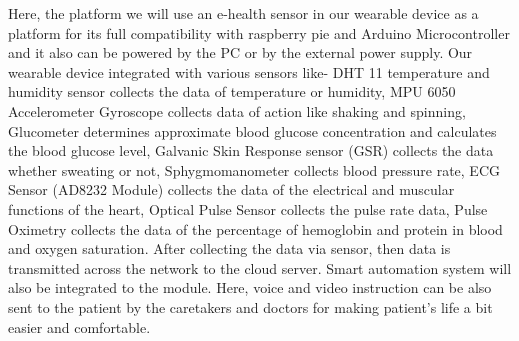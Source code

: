 \vspace{0.5cm}
Here, the platform we will use an e-health sensor in our wearable device as a platform for its full compatibility with raspberry pie and Arduino Microcontroller and it also can be powered by the PC or by the external power supply. %
Our wearable device integrated with various sensors like-  
DHT 11 temperature and humidity sensor collects the data of temperature or humidity, MPU 6050 Accelerometer Gyroscope collects data of action like shaking and spinning, Glucometer determines approximate blood glucose concentration and calculates the blood glucose level, Galvanic Skin Response sensor (GSR) collects the data whether sweating or not, Sphygmomanometer collects blood pressure rate, ECG Sensor (AD8232 Module) collects the data of the electrical and muscular functions of the heart, Optical Pulse Sensor collects the pulse rate data, Pulse Oximetry collects the data of the percentage of hemoglobin and protein in blood and oxygen saturation. After collecting the data via sensor, then data is transmitted across the network to the cloud server. %
 Smart automation system will also be integrated to the module. Here, voice and video instruction can be also sent to the patient by the caretakers and doctors for making patient’s life a bit easier and comfortable.
 
 
 
